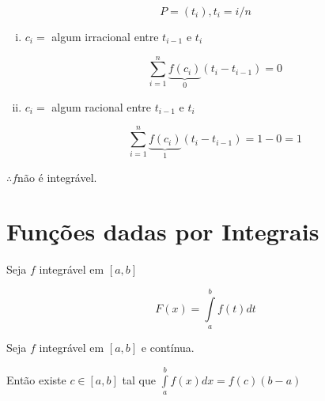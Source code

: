 \documentclass[11pt, oneside, a4paper]{gsm-l}
\begin{document}
\begin{sol}

\[
P = \left( {t_i } \right),t_i = i / n
\]


\begin{enumerate} [i)]

\item $c_i = $ algum irracional entre $t_{i - 1} $ e $t_i $

\[
\sum\limits_{i = 1}^n {\underbrace {f\left( {c_i } \right)}_0\left( {t_i -
t_{i - 1} } \right)} = 0
\]


\item $c_i = $ algum racional entre $t_{i - 1} $ e $t_i $

\[
\sum\limits_{i = 1}^n {\underbrace {f\left( {c_i } \right)}_1\left( {t_i -
t_{i - 1} } \right)} = 1 - 0 = 1
\]


\end{enumerate}

$\therefore f$não é integrável.

\end{sol}


\section{Funções dadas por Integrais} \label{sec06}



Seja $f$ integrável em $\left[ {a,b} \right]$

\[
F\left( x \right) = \int\limits_a^b {f\left( t \right)dt}
\]


\begin{teo}

Seja $f$ integrável em $\left[ {a,b} \right]$ e contínua.

Então existe $c \in \left[ {a,b} \right]$ tal que $\int\limits_a^b
{f\left( x \right)dx} = f\left( c \right)\left( {b - a} \right)$

\end{teo}


\end{document}
